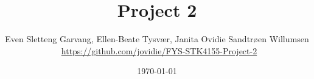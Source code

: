 \documentclass[reprint,english,notitlepage,nofootinbib]{revtex4-1}  %
\begin{document}

\title{Project 2}
\author{Even Sletteng Garvang, Ellen-Beate Tysvær, Janita Ovidie Sandtrøen Willumsen \\ \faGithub \, \url{https://github.com/jovidie/FYS-STK4155-Project-2}}        
\date{\today}
\noaffiliation


\maketitle





\newpage

 
\onecolumngrid
\newpage 


\newpage
\twocolumngrid



\end{document}

